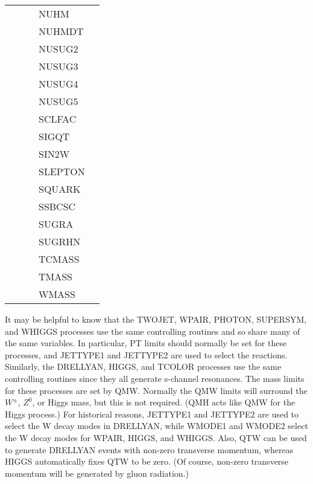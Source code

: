 \begin{center}
\begin{tabular}{lllll}
            &             &             & NUHM        & \\
            &             &             & NUHMDT      & \\
            &             &             & NUSUG2      & \\
            &             &             & NUSUG3      & \\
            &             &             & NUSUG4      & \\
            &             &             & NUSUG5      & \\
            &             &             & SCLFAC      & \\
            &             &             & SIGQT       & \\
            &             &             & SIN2W       & \\
            &             &             & SLEPTON     & \\
            &             &             & SQUARK      & \\
            &             &             & SSBCSC      & \\
            &             &             & SUGRA       & \\
            &             &             & SUGRHN      & \\
            &             &             & TCMASS      & \\
            &             &             & TMASS       & \\
            &             &             & WMASS       & \\
\hline\hline
\end{tabular}
\end{center}

      It may be helpful to know that the TWOJET, WPAIR, PHOTON,
SUPERSYM, and WHIGGS processes use the same controlling routines and
so share many of the same variables.  In particular, PT limits should
normally be set for these processes, and JETTYPE1 and JETTYPE2 are
used to select the reactions. Similarly, the DRELLYAN, HIGGS, and
TCOLOR processes use the same controlling routines since they all
generate s-channel resonances. The mass limits for these processes are
set by QMW.  Normally the QMW limits will surround the $W^\pm$, $Z^0$,
or Higgs mass, but this is not required.  (QMH acts like QMW for the
Higgs process.) For historical reasons, JETTYPE1 and JETTYPE2 are used
to select the W decay modes in DRELLYAN, while WMODE1 and WMODE2 select
the W decay modes for WPAIR, HIGGS, and WHIGGS. Also, QTW can be used
to generate DRELLYAN events with non-zero transverse momentum, whereas
HIGGS automatically fixes QTW to be zero. (Of course, non-zero
transverse momentum will be generated by gluon radiation.)

